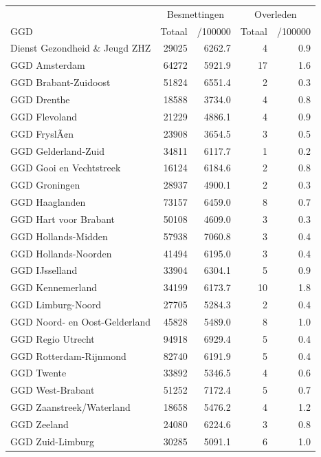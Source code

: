 \documentclass[
  english,
  man,floatsintext]{apa6}
\begin{document}
\begin{table}
\centering\begingroup\fontsize{10}{12}\selectfont

\begin{threeparttable}
\begin{tabular}{lrrrr}
\toprule
\multicolumn{1}{c}{ } & \multicolumn{2}{c}{Besmettingen} & \multicolumn{2}{c}{Overleden} \\
\cmidrule(l{3pt}r{3pt}){2-3} \cmidrule(l{3pt}r{3pt}){4-5}
GGD & Totaal & /100000 & Totaal & /100000\\
\midrule
Dienst Gezondheid \& Jeugd ZHZ & 29025 & 6262.7 & 4 & 0.9\\
GGD Amsterdam & 64272 & 5921.9 & 17 & 1.6\\
GGD Brabant-Zuidoost & 51824 & 6551.4 & 2 & 0.3\\
GGD Drenthe & 18588 & 3734.0 & 4 & 0.8\\
GGD Flevoland & 21229 & 4886.1 & 4 & 0.9\\
GGD FryslÃ¢n & 23908 & 3654.5 & 3 & 0.5\\
GGD Gelderland-Zuid & 34811 & 6117.7 & 1 & 0.2\\
GGD Gooi en Vechtstreek & 16124 & 6184.6 & 2 & 0.8\\
GGD Groningen & 28937 & 4900.1 & 2 & 0.3\\
GGD Haaglanden & 73157 & 6459.0 & 8 & 0.7\\
GGD Hart voor Brabant & 50108 & 4609.0 & 3 & 0.3\\
GGD Hollands-Midden & 57938 & 7060.8 & 3 & 0.4\\
GGD Hollands-Noorden & 41494 & 6195.0 & 3 & 0.4\\
GGD IJsselland & 33904 & 6304.1 & 5 & 0.9\\
GGD Kennemerland & 34199 & 6173.7 & 10 & 1.8\\
GGD Limburg-Noord & 27705 & 5284.3 & 2 & 0.4\\
GGD Noord- en Oost-Gelderland & 45828 & 5489.0 & 8 & 1.0\\
GGD Regio Utrecht & 94918 & 6929.4 & 5 & 0.4\\
GGD Rotterdam-Rijnmond & 82740 & 6191.9 & 5 & 0.4\\
GGD Twente & 33892 & 5346.5 & 4 & 0.6\\
GGD West-Brabant & 51252 & 7172.4 & 5 & 0.7\\
GGD Zaanstreek/Waterland & 18658 & 5476.2 & 4 & 1.2\\
GGD Zeeland & 24080 & 6224.6 & 3 & 0.8\\
GGD Zuid-Limburg & 30285 & 5091.1 & 6 & 1.0\\

\end{tabular}
\end{threeparttable}
\end{table}
\end{document}
